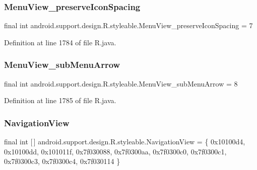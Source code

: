 \subsubsection{\texorpdfstring{MenuView\_preserveIconSpacing}{MenuView\_preserveIconSpacing}}
{\footnotesize\ttfamily final int android.\+support.\+design.\+R.\+styleable.\+Menu\+View\+\_\+preserve\+Icon\+Spacing = 7\hspace{0.3cm}{\ttfamily [static]}}



Definition at line 1784 of file R.\+java.

\mbox{\label{classandroid_1_1support_1_1design_1_1_r_1_1styleable_a352b57921080ad1173656d23983518f6}} 
\subsubsection{\texorpdfstring{MenuView\_subMenuArrow}{MenuView\_subMenuArrow}}
{\footnotesize\ttfamily final int android.\+support.\+design.\+R.\+styleable.\+Menu\+View\+\_\+sub\+Menu\+Arrow = 8\hspace{0.3cm}{\ttfamily [static]}}



Definition at line 1785 of file R.\+java.

\mbox{\label{classandroid_1_1support_1_1design_1_1_r_1_1styleable_a277c199f371e8804c26e2cd6dbf88999}} 
\subsubsection{\texorpdfstring{NavigationView}{NavigationView}}
{\footnotesize\ttfamily final int \mbox{[}$\,$\mbox{]} android.\+support.\+design.\+R.\+styleable.\+Navigation\+View = \{ 0x10100d4, 0x10100dd, 0x101011f, 0x7f030088, 0x7f0300aa, 0x7f0300c0, 0x7f0300c1, 0x7f0300c3, 0x7f0300c4, 0x7f030114 \}\hspace{0.3cm}{\ttfamily [static]}}



